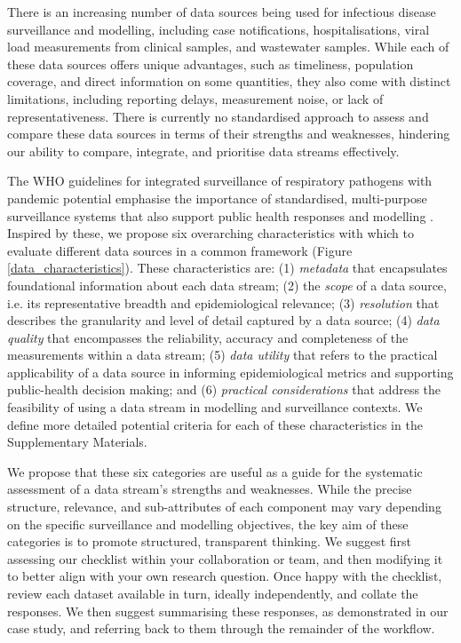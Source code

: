 \documentclass{article}
\begin{document}
There is an increasing number of data sources being used for infectious disease surveillance and modelling, including case notifications, hospitalisations, viral load measurements from clinical samples, and wastewater samples. While each of these data sources offers unique advantages, such as timeliness, population coverage, and direct information on some quantities, they also come with distinct limitations, including reporting delays,  measurement noise, or lack of representativeness. There is currently no standardised approach to assess and compare these data sources in terms of their strengths and weaknesses, hindering our ability to compare, integrate, and prioritise data streams effectively. 

The WHO guidelines for integrated surveillance of respiratory pathogens with pandemic potential emphasise the importance of standardised, multi-purpose surveillance systems that also support public health responses and modelling \citep{world2024implementing}. Inspired by these, we propose six overarching characteristics with which to evaluate different data sources in a common framework (Figure \ref{data_characteristics}).  These characteristics are: (1) \textit{metadata}  that encapsulates foundational information about each data stream; (2) the \textit{scope} of a data source, i.e. its representative breadth and epidemiological relevance; (3) \textit{resolution} that describes the granularity and level of detail captured by a data source; (4) \textit{data quality} that encompasses the reliability, accuracy and completeness of the measurements within a data stream; (5) \textit{data utility} that refers to the practical applicability of a data source in informing epidemiological metrics and supporting public-health decision making; and (6)\textit{ practical considerations} that address the feasibility of using a data stream in modelling and surveillance contexts. We define more detailed potential criteria for each of these characteristics in the Supplementary Materials. 

We propose that these six categories are useful as a guide for the systematic assessment of a data stream's strengths and weaknesses. While the precise structure, relevance, and sub-attributes of each component may vary depending on the specific surveillance and modelling objectives, the key aim of these categories is to promote structured, transparent thinking. We suggest first assessing our checklist within your collaboration or team,  and then modifying it to better align with your own research question. Once happy with the checklist, review each dataset available in turn, ideally independently, and collate the responses. We then suggest summarising these responses, as demonstrated in our case study, and referring back to them through the remainder of the workflow.
\end{document}
